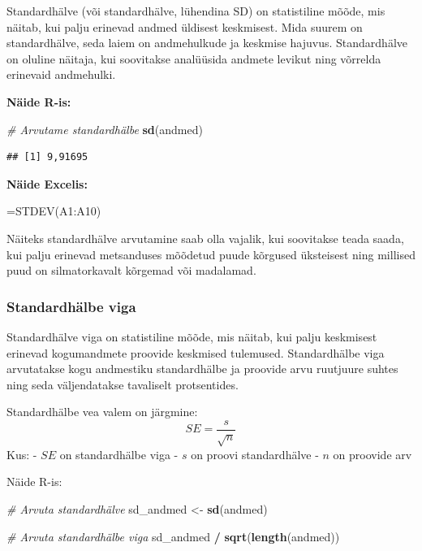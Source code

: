 \documentclass[
]{book}
\newenvironment{Shaded}{\begin{snugshade}}{\end{snugshade}}
\newcommand{\CommentTok}[1]{\textcolor[rgb]{0.56,0.35,0.01}{\textit{#1}}}
\newcommand{\FunctionTok}[1]{\textcolor[rgb]{0.13,0.29,0.53}{\textbf{#1}}}
\newcommand{\NormalTok}[1]{#1}
\newcommand{\OtherTok}[1]{\textcolor[rgb]{0.56,0.35,0.01}{#1}}
\newcommand{\SpecialCharTok}[1]{\textcolor[rgb]{0.81,0.36,0.00}{\textbf{#1}}}
\renewenvironment{Shaded} {\begin{snugshade}\footnotesize} {\end{snugshade}}
\begin{document}
Standardhälve (või standardhälve, lühendina SD) on statistiline mõõde, mis näitab, kui palju erinevad andmed üldisest keskmisest. Mida suurem on standardhälve, seda laiem on andmehulkude ja keskmise hajuvus. Standardhälve on oluline näitaja, kui soovitakse analüüsida andmete levikut ning võrrelda erinevaid andmehulki.

\textbf{Näide R-is:}

\begin{Shaded}
\begin{Highlighting}[]
\CommentTok{\# Arvutame standardhälbe}
\FunctionTok{sd}\NormalTok{(andmed)}
\end{Highlighting}
\end{Shaded}

\begin{verbatim}
## [1] 9,91695
\end{verbatim}

\textbf{Näide Excelis:}

\begin{Shaded}
\begin{Highlighting}[]
\NormalTok{=STDEV(A1:A10)}
\end{Highlighting}
\end{Shaded}

Näiteks standardhälve arvutamine saab olla vajalik, kui soovitakse teada saada, kui palju erinevad metsanduses mõõdetud puude kõrgused üksteisest ning millised puud on silmatorkavalt kõrgemad või madalamad.

\subsubsection{Standardhälbe viga}\label{standardhuxe4lbe-viga}

Standardhälve viga on statistiline mõõde, mis näitab, kui palju keskmisest erinevad kogumandmete proovide keskmised tulemused. Standardhälbe viga arvutatakse kogu andmestiku standardhälbe ja proovide arvu ruutjuure suhtes ning seda väljendatakse tavaliselt protsentides.

Standardhälbe vea valem on järgmine:
\[ SE = \frac{s}{\sqrt{n}}\]
Kus:
- \(SE\) on standardhälbe viga
- \(s\) on proovi standardhälve
- \(n\) on proovide arv

Näide R-is:

\begin{Shaded}
\begin{Highlighting}[]
\CommentTok{\# Arvuta standardhälve}
\NormalTok{sd\_andmed }\OtherTok{\textless{}{-}} \FunctionTok{sd}\NormalTok{(andmed)}

\CommentTok{\# Arvuta standardhälbe viga}
\NormalTok{sd\_andmed }\SpecialCharTok{/} \FunctionTok{sqrt}\NormalTok{(}\FunctionTok{length}\NormalTok{(andmed))}
\end{Highlighting}
\end{Shaded}
\end{document}

